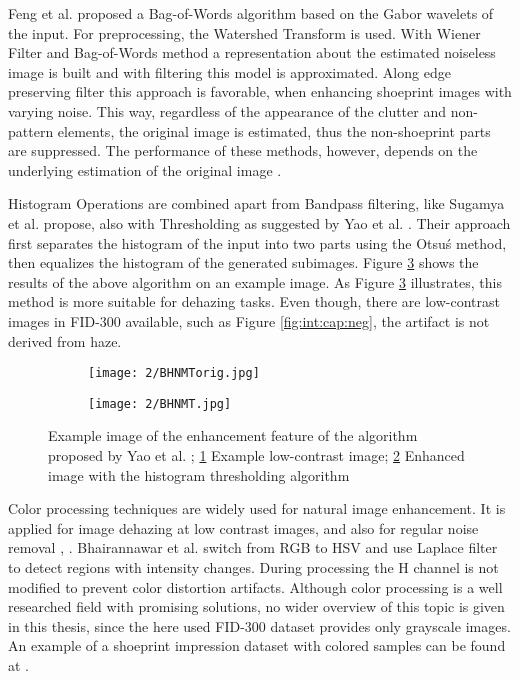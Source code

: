 \documentclass[draft,final]{vutinfth} %
\begin{document}
Feng et al. \cite{feng2011bag} proposed a Bag-of-Words algorithm based on the Gabor wavelets of the input. 
For preprocessing, the Watershed Transform is used.
With Wiener Filter and Bag-of-Words method a representation about the estimated noiseless image is built and with filtering this model is approximated.
Along edge preserving filter this approach is favorable, when enhancing shoeprint images with varying noise.
This way, regardless of the appearance of the clutter and non-pattern elements, the original image is estimated, thus the non-shoeprint parts are suppressed.
The performance of these methods, however, depends on the underlying estimation of the original image \cite{li2014rapid}.
\par
Histogram Operations are combined apart from Bandpass filtering, like Sugamya et al. \cite{sugamya2016image} propose, also with Thresholding as suggested by Yao et al. \cite{yao2016image}. 
Their approach first separates the histogram of the input into two parts using the Otsu\'s method, then equalizes the histogram of the generated subimages. 
Figure \ref{fig:rw:BHNMT} shows the results of the above algorithm on an example image.
As Figure \ref{fig:rw:BHNMT} illustrates, this method is more suitable for dehazing tasks. 
Even though, there are low-contrast images in FID-300 available, such as Figure \ref{fig:int:cap:neg}, the artifact is not derived from haze.

\begin{figure}[h]
  \centering
  \begin{subfigure}[t]{0.4\columnwidth}
    \centering
    \texttt{[image: 2/BHNMTorig.jpg]}
    \subcaption{}
    \label{fig:rw:BHNMTin}
  \end{subfigure}
  \begin{subfigure}[t]{0.4\columnwidth}
    \centering
    \texttt{[image: 2/BHNMT.jpg]}
    \subcaption{}
    \label{fig:rw:BHNMTout}
  \end{subfigure}
  \caption{Example image of the enhancement feature of the algorithm proposed by Yao et al. \cite{yao2016image};
			\ref{fig:rw:BHNMTin} Example low-contrast image; \ref{fig:rw:BHNMTout} Enhanced image with the histogram thresholding algorithm}
  \label{fig:rw:BHNMT} %
\end{figure}

\par
Color processing techniques are widely used for natural image enhancement.
It is applied for image dehazing at low contrast images, \cite{singh2018dehazing} and also for regular noise removal \cite{ren2018joint}, \cite{zhang2016simultaneous}. 
Bhairannawar et al. \cite{bhairannawar2017color} switch from RGB to HSV and use Laplace filter to detect regions with intensity changes. 
During processing the H channel is not modified to prevent color distortion artifacts.
Although color processing is a well researched field with promising solutions, no wider overview of this topic is given in this thesis, since the here used FID-300 dataset provides only grayscale images. 
An example of a shoeprint impression dataset with colored samples can be found at \cite{katireddy2017novel}. 
\end{document}
